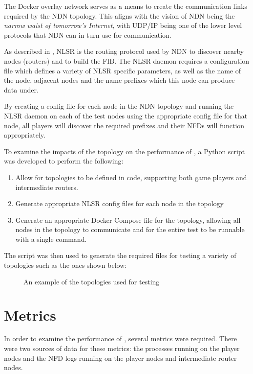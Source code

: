 The Docker overlay network serves as a means to create the communication links required by the NDN topology. This aligns with the vision of NDN being the \textit{narrow waist of tomorrow's Internet}, with UDP/IP being one of the lower level protocols that NDN can in turn use for communication.

As described in , NLSR is the routing protocol used by NDN to discover nearby nodes (routers) and to build the FIB. The NLSR daemon requires a configuration file which defines a variety of NLSR specific parameters, as well as the name of the node, adjacent nodes and the name prefixes which this node can produce data under. 

By creating a config file for each node in the NDN topology and running the NLSR daemon on each of the test nodes using the appropriate config file for that node, all players will discover the required prefixes and their NFDs will function appropriately.

To examine the impacts of the topology on the performance of \game{}, a Python script was developed to perform the following:

\begin{enumerate}
    \item Allow for topologies to be defined in code, supporting both game players and intermediate routers.
    \item Generate appropriate NLSR config files for each node in the topology
    \item Generate an appropriate Docker Compose file for the topology, allowing all nodes in the topology to communicate and for the entire test to be runnable with a single command.
\end{enumerate}

The script was then used to generate the required files for testing a variety of topologies such as the ones shown below:

\begin{figure}[H]
    \centering
    \caption{An example of the topologies used for testing \game{}}
    \label{fig:app:topologies}
\end{figure}


\section{Metrics}
In order to examine the performance of \game{}, several metrics were required. There were two sources of data for these metrics: the \game{} processes running on the player nodes and the NFD logs running on the player nodes and intermediate router nodes. 

